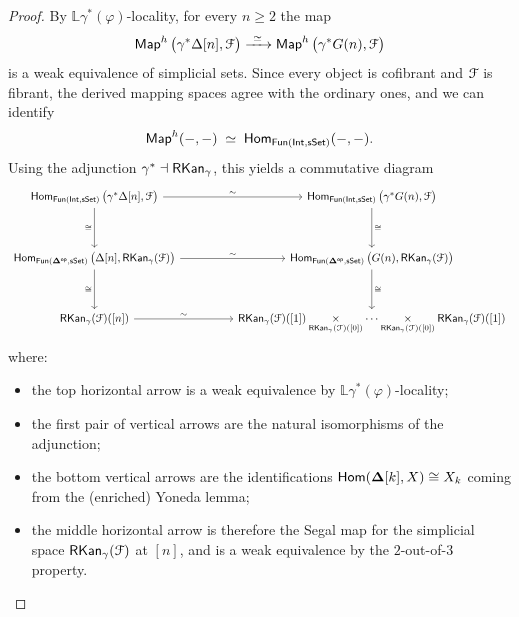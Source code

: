 \begin{proof}
    By $\mathbb{L}\gamma^*(\varphi)$-locality, for every $n\geq 2$ the map
    \begin{equation}
      \operatorname{\sf Map}^{h}\big(\gamma^* \Delta[n], \mathcal F\big)
        \xrightarrow{\ \simeq\ }
      \operatorname{\sf Map}^{h}\big(\gamma^* G(n), \mathcal F\big)
    \end{equation}
    is a weak equivalence of simplicial sets. Since every object is cofibrant
    and $\mathcal F$ is fibrant, the derived mapping spaces agree with the ordinary
    ones, and we can identify
    \begin{equation}
      \operatorname{\sf Map}^{h}(-,-)\;\simeq\;
      \operatorname{\sf Hom}_{\operatorname{\sf Fun}(\operatorname{\mathsf{Int}},\operatorname{\sf sSet})}(-,-).
    \end{equation}
    Using the adjunction $\gamma^\ast \dashv \operatorname{{\sf RKan}}_{\gamma}$, this yields a
    commutative diagram
    \begin{equation}
        \begin{tikzcd}[ampersand replacement=\&]
            {\Hom_{\fun(\Int,\sset)}\big(\gamma^* \Delta[n], \cF\big)} \&\&
            {\Hom_{\fun(\Int,\sset)}\big(\gamma^* G(n), \cF\big)} \\
            \\
            {\Hom_{\fun(\bDelta^{\op},\sset)}\big(\Delta[n], \rkan_{\gamma}(\cF)\big)} \&\&
            {\Hom_{\fun(\bDelta^{\op},\sset)}\big(G(n), \rkan_{\gamma}(\cF)\big)} \\
            \\
            {\rkan_{\gamma}(\cF)([n])} \&\&
            {\rkan_{\gamma}(\cF)([1])\underset{\rkan_{\gamma}(\cF)([0])}{\times}\cdots
              \underset{\rkan_{\gamma}(\cF)([0])}{\times}\rkan_{\gamma}(\cF)([1])}
            \arrow["\sim", from=1-1, to=1-3]
            \arrow["\cong"', from=1-1, to=3-1]
            \arrow["\cong", from=1-3, to=3-3]
            \arrow["\sim",  from=3-1, to=3-3]
            \arrow["\cong"', from=3-1, to=5-1]
            \arrow["\cong", from=3-3, to=5-3]
            \arrow["\sim",from=5-1, to=5-3]
        \end{tikzcd}
    \end{equation}
    where:
    \begin{itemize}
      \item the top horizontal arrow is a weak equivalence by
            $\mathbb{L}\gamma^*(\varphi)$-locality;
      \item the first pair of vertical arrows are the natural isomorphisms of
            the adjunction;
      \item the bottom vertical arrows are the identifications
            $\operatorname{\sf Hom}(\mathbf\Delta[k],X)\cong X_k$ coming from the (enriched) Yoneda
            lemma;
      \item the middle horizontal arrow is therefore the Segal map for the
            simplicial space $\operatorname{{\sf RKan}}_\gamma(\mathcal F)$ at $[n]$, and is a weak
            equivalence by the $2$-out-of-$3$ property.
    \end{itemize}


\end{proof}
